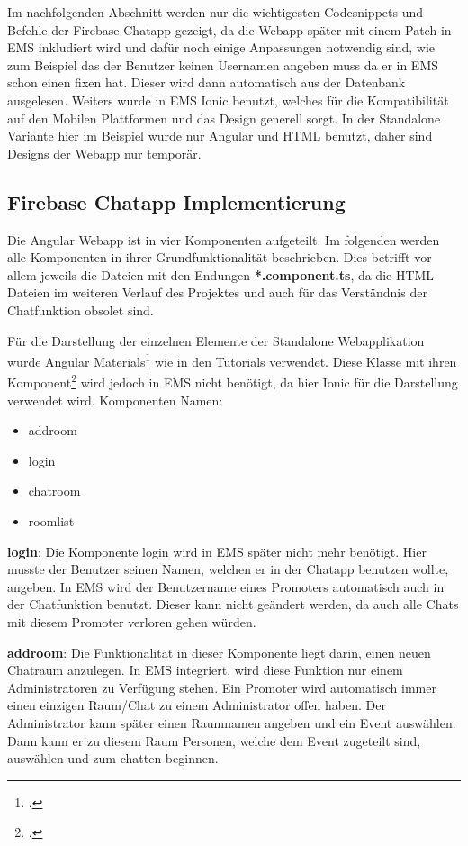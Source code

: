 Im nachfolgenden Abschnitt werden nur die wichtigesten Codesnippets und Befehle der Firebase Chatapp gezeigt, da die Webapp später mit einem Patch in EMS inkludiert wird und dafür noch einige Anpassungen notwendig sind,
wie zum Beispiel das der Benutzer keinen Usernamen angeben muss da er in EMS schon einen fixen hat. Dieser wird dann automatisch aus der Datenbank ausgelesen. Weiters wurde in EMS Ionic benutzt, welches für die 
Kompatibilität auf den Mobilen Plattformen und das Design generell sorgt. In der Standalone Variante hier im Beispiel wurde nur Angular und HTML benutzt, daher sind Designs der Webapp nur temporär.

\subsection{Firebase Chatapp Implementierung}
Die Angular Webapp ist in vier Komponenten aufgeteilt. Im folgenden werden alle Komponenten in ihrer Grundfunktionalität beschrieben. Dies betrifft vor allem jeweils die Dateien mit den Endungen \textbf{*.component.ts}, da die 
HTML Dateien im weiteren Verlauf des Projektes und auch für das Verständnis der Chatfunktion obsolet sind.

Für die Darstellung der einzelnen Elemente der Standalone Webapplikation wurde Angular Materials\footcite{materials} wie in den Tutorials verwendet.
Diese Klasse mit ihren Komponent\footcite{matierials-componenten} wird jedoch in EMS nicht benötigt, da hier Ionic für die Darstellung verwendet wird.
Komponenten Namen:
\begin{itemize}
	\item addroom
	\item login
	\item chatroom
	\item roomlist
\end{itemize}

\textbf{login}: Die Komponente login wird in EMS später nicht mehr benötigt. Hier musste der Benutzer seinen Namen, welchen er in der Chatapp benutzen wollte, angeben. In EMS wird der Benutzername eines Promoters automatisch
auch in der Chatfunktion benutzt. Dieser kann nicht geändert werden, da auch alle Chats mit diesem Promoter verloren gehen würden.

\textbf{addroom}: Die Funktionalität in dieser Komponente liegt darin, einen neuen Chatraum anzulegen. In EMS integriert, wird diese Funktion nur einem Administratoren zu
Verfügung stehen. Ein Promoter wird automatisch immer einen einzigen Raum/Chat zu einem Administrator offen haben. Der Administrator kann später einen Raumnamen angeben und ein Event auswählen. Dann kann er zu diesem Raum Personen,
welche dem Event zugeteilt sind, auswählen und zum chatten beginnen.

